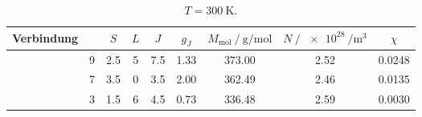 \begin{table}
	\centering
	\caption{$T = \qty{300}{\kelvin}$.}
	\label{tab:zahlen}
	\begin{tabular}{c
			S[table-format=1.0]
			S[table-format=1.1]
			S[table-format=1.0]
			S[table-format=1.1]
			S[table-format=1.2]
			S[table-format=3.2]
			S[table-format=1.2]
			S[table-format=1.4]}
		\toprule
		Verbindung &  & $S$ & $L$ & $J$ & $g_J$ &
		{$M_\text{mol} \mathbin{/} \unit{\gram\per\mole}$} &
		{$N \mathbin{/} \qty{e28}{\per\cubic\meter}$} & $\chi$ \\
		\midrule
		 & 9 & 2.5 & 5 & 7.5 & 1.33 & 373.00 & 2.52 & 0.0248 \\
		 & 7 & 3.5 & 0 & 3.5 & 2.00 & 362.49 & 2.46 & 0.0135 \\
		 & 3 & 1.5 & 6 & 4.5 & 0.73 & 336.48 & 2.59 & 0.0030 \\
		\bottomrule
	\end{tabular}
\end{table}
